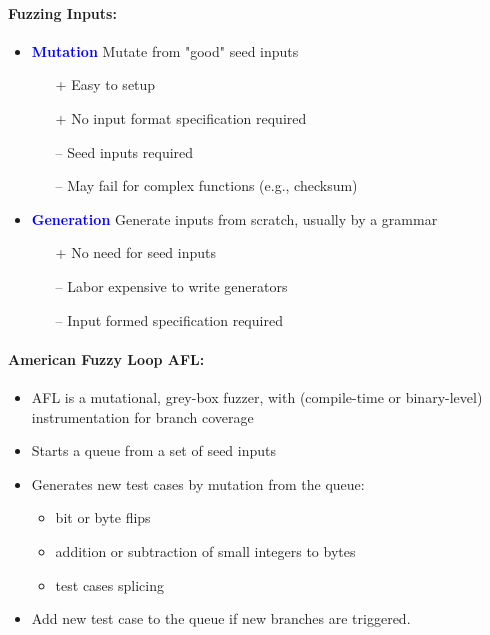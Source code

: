 \paragraph{Fuzzing Inputs:}
\begin{itemize}
    \item \textbf{\textcolor{blue}{Mutation}} Mutate from "good" seed inputs
        \begin{itemize}
            \item[\color{green}+] Easy to setup
            \item[\color{green}+] No input format specification required
            \item[\color{red}--] Seed inputs required
            \item[\color{red}--] May fail for complex functions (e.g., checksum)
        \end{itemize}
    \item \textbf{\textcolor{blue}{Generation}} Generate inputs from scratch, usually by a grammar
    \begin{itemize} 
        \item[\color{green}+] No need for seed inputs
        \item[\color{red}--] Labor expensive to write generators 
        \item[\color{red}--] Input formed specification required
    \end{itemize}
\end{itemize}
\paragraph{American Fuzzy Loop \textbf{AFL}:}
\begin{itemize}
    \item AFL is a mutational, grey-box fuzzer, with (compile-time or binary-level) instrumentation for branch coverage
    \item Starts a queue from a set of seed inputs
    \item Generates new test cases by mutation from the queue:
    \begin{itemize}
        \item bit or byte flips
        \item addition or subtraction of small integers to bytes
        \item test cases splicing
    \end{itemize}
    \item Add new test case to the queue if new branches are triggered.
\end{itemize}

